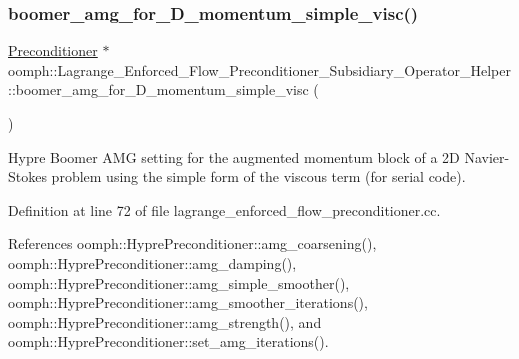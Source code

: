 \subsubsection{\texorpdfstring{boomer\+\_\+amg\+\_\+for\+\_\+D\+\_\+momentum\+\_\+simple\+\_\+visc()}{boomer\_amg\_for\_2D\_momentum\_simple\_visc()}}
{\footnotesize\ttfamily \hyperlink{classoomph_1_1Preconditioner}{Preconditioner} $\ast$ oomph\+::\+Lagrange\+\_\+\+Enforced\+\_\+\+Flow\+\_\+\+Preconditioner\+\_\+\+Subsidiary\+\_\+\+Operator\+\_\+\+Helper\+::boomer\+\_\+amg\+\_\+for\+\_\+D\+\_\+momentum\+\_\+simple\+\_\+visc (\begin{DoxyParamCaption}{ }\end{DoxyParamCaption})}



Hypre Boomer A\+MG setting for the augmented momentum block of a 2D Navier-\/\+Stokes problem using the simple form of the viscous term (for serial code). 



Definition at line 72 of file lagrange\+\_\+enforced\+\_\+flow\+\_\+preconditioner.\+cc.



References oomph\+::\+Hypre\+Preconditioner\+::amg\+\_\+coarsening(), oomph\+::\+Hypre\+Preconditioner\+::amg\+\_\+damping(), oomph\+::\+Hypre\+Preconditioner\+::amg\+\_\+simple\+\_\+smoother(), oomph\+::\+Hypre\+Preconditioner\+::amg\+\_\+smoother\+\_\+iterations(), oomph\+::\+Hypre\+Preconditioner\+::amg\+\_\+strength(), and oomph\+::\+Hypre\+Preconditioner\+::set\+\_\+amg\+\_\+iterations().

\mbox{\label{namespaceoomph_1_1Lagrange__Enforced__Flow__Preconditioner__Subsidiary__Operator__Helper_a349a343a6d474527ffbbf77bebbb453a}} 
